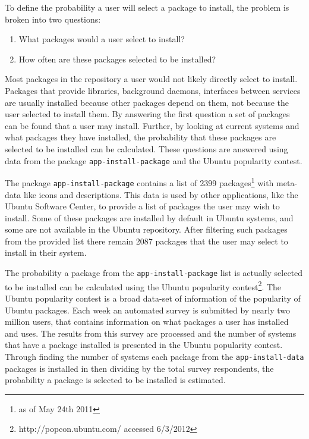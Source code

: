 To define the probability a user will select a package to install, the problem is broken into two questions:
\begin{enumerate}
  \item What packages would a user select to install?
  \item How often are these packages selected to be installed?
\end{enumerate}
Most packages in the repository a user would not likely directly select to install.
Packages that provide libraries, background daemons, interfaces between services are usually installed because other packages depend on them, not because the user selected to install them.
By answering the first question a set of packages can be found that a user may install.
Further, by looking at current systems and what packages they have installed, the probability that these packages are selected to be installed can be calculated.
These questions are answered using data from the package \texttt{app-install-package} and the Ubuntu popularity contest.

The package \texttt{app-install-package} contains a list of 2399 packages\footnote{as of May 24th 2011} with meta-data like icons and descriptions.
This data is used by other applications, like the Ubuntu Software Center, to provide a list of packages the user may wish to install.
Some of these packages are installed by default in Ubuntu systems, and some are not available in the Ubuntu repository.
After filtering such packages from the provided list there remain 2087 packages that the user may select to install in their system. 

The probability a package from the \texttt{app-install-package} list is actually selected to be installed can be calculated using the Ubuntu popularity contest\footnote{http://popcon.ubuntu.com/ accessed 6/3/2012}.
The Ubuntu popularity contest is a broad data-set of information of the popularity of Ubuntu packages.
Each week an automated survey is submitted by nearly two million users, that contains information on what packages a user has installed and uses.
The results from this survey are processed and the number of systems that have a package installed is presented in the Ubuntu popularity contest.
Through finding the number of systems each package from the \texttt{app-install-data} packages is installed in then dividing by the total survey respondents, 
the probability a package is selected to be installed is estimated.

